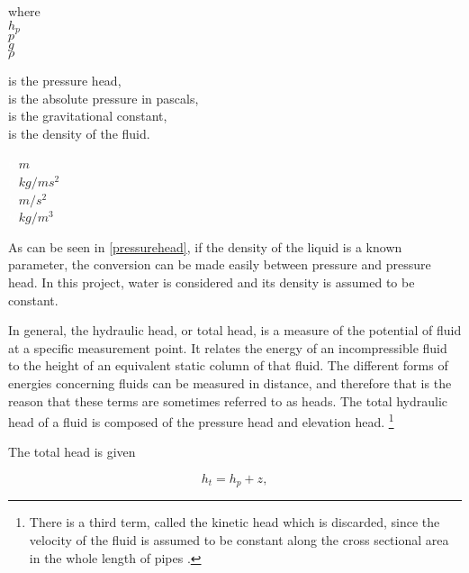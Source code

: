 \begin{minipage}[t]{0.20\textwidth}
where\\
\hspace*{8mm} $h_p$ \\
\hspace*{8mm} $p$ \\
\hspace*{8mm} $g$ \\
\hspace*{8mm} $\rho$ 
\end{minipage}
\begin{minipage}[t]{0.63\textwidth}
\vspace*{2mm}
is the pressure head,\\
is the absolute pressure in pascals, \\
is the gravitational constant, \\
is the density of the fluid.
\end{minipage}
\begin{minipage}[t]{0.15\textwidth}
\vspace*{2mm}
\textcolor{White}{te}$\unit{m}$\\
\textcolor{White}{te}$\unit{kg/ms^2}$\\
\textcolor{White}{te}$\unit{m/s^2}$\\
\textcolor{White}{te}$\unit{kg/m^3}$
\end{minipage}

As can be seen in \eqref{pressurehead}, if the density of the liquid is a known parameter, the conversion can be made easily between pressure and pressure head. In this project, water is considered and its density is assumed to be constant. 

In general, the hydraulic head, or total head, is a measure of the potential of fluid at a specific measurement point. It relates the energy of an incompressible fluid to the height of an equivalent static column of that fluid. The different forms of energies concerning fluids can be measured in distance, and therefore that is the reason that these terms are sometimes referred to as heads. The total hydraulic head of a fluid is composed of the pressure head and elevation head. \footnote{There is a third term, called the kinetic head which is discarded, since the velocity of the fluid is assumed to be constant along the cross sectional area in the whole length of pipes \cite{chen2016sustainable}.}

The total head is given 

\begin{equation}
\label{totalhead}
  h_t = h_p + z,
\end{equation}


